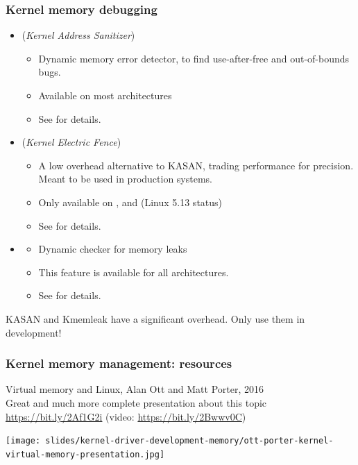 \begin{frame}
  \frametitle{Kernel memory debugging}
  \begin{itemize}
  \item {} ({\em Kernel Address Sanitizer})
    \begin{itemize}
    \item Dynamic memory error detector, to find use-after-free and
      out-of-bounds bugs.
    \item Available on most architectures
    \item See  for details.
    \end{itemize}
  \item {} ({\em Kernel Electric Fence})
    \begin{itemize}
    \item A low overhead alternative to KASAN, trading performance
	  for precision. Meant to be used in production systems.
    \item Only available on ,  and 
          (Linux 5.13 status)
    \item See  for details.
    \end{itemize}
  \item {}
    \begin{itemize}
    \item Dynamic checker for memory leaks
    \item This feature is available for all architectures.
    \item See  for details.
    \end{itemize}
  \end{itemize}
  KASAN and Kmemleak have a significant overhead. Only use them in development!
\end{frame}

\begin{frame}
  \frametitle{Kernel memory management: resources}
  Virtual memory and Linux, Alan Ott and Matt Porter, 2016\\
  Great and much more complete presentation about this topic\\
  \url{https://bit.ly/2Af1G2i} (video: \url{https://bit.ly/2Bwwv0C})
  \begin{center}
     \texttt{[image: slides/kernel-driver-development-memory/ott-porter-kernel-virtual-memory-presentation.jpg]}
  \end{center}
\end{frame}
